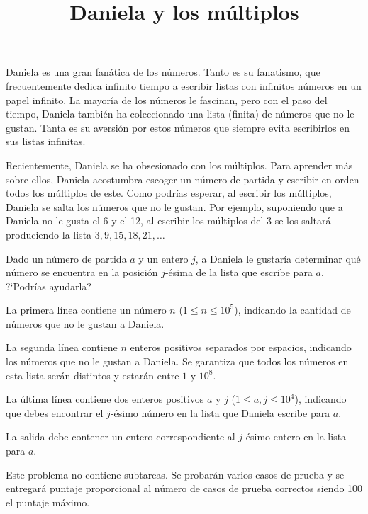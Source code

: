 \documentclass{oci}
\title{Daniela y los múltiplos}
\begin{document}
\begin{problemDescription}
Daniela es una gran fanática de los números.
Tanto es su fanatismo, que frecuentemente dedica infinito tiempo a
escribir listas con infinitos números en un papel infinito.
La mayoría de los números le fascinan, pero con el paso del tiempo,
Daniela también ha coleccionado una lista (finita) de números que no
le gustan.
Tanta es su aversión por estos números que siempre evita escribirlos en sus
listas infinitas.

Recientemente, Daniela se ha obsesionado con los múltiplos.
Para aprender más sobre ellos, Daniela acostumbra escoger un número de partida y
escribir en orden todos los múltiplos de este.
Como podrías esperar, al escribir los múltiplos, Daniela se salta los números que no le gustan.
Por ejemplo, suponiendo que a Daniela no le gusta el 6 y el 12, al escribir los múltiplos
del 3 se los saltará produciendo la lista $3, 9, 15, 18, 21, \ldots$

Dado un número de partida $a$ y un entero $j$, a Daniela le gustaría determinar
qué número se encuentra en la posición $j$-ésima de la lista que escribe para $a$.
?`Podrías ayudarla?
\end{problemDescription}

\begin{inputDescription}
La primera línea contiene un número $n$ ($1 \leq n \leq 10^5$), indicando la cantidad de números que no le gustan
a Daniela.

La segunda línea contiene $n$ enteros positivos separados por espacios,
indicando los números que no le gustan a Daniela.
Se garantiza que todos los números en esta lista serán distintos y estarán entre $1$ y $10^8$.

La última línea contiene dos enteros positivos $a$ y $j$ ($1 \leq a, j \leq 10^4$),
indicando que debes encontrar el $j$-ésimo número en la lista que Daniela
escribe para $a$.
\end{inputDescription}

\begin{outputDescription}
La salida debe contener un entero correspondiente al $j$-ésimo entero en la lista
para $a$.
\end{outputDescription}

\begin{scoreDescription}
Este problema no contiene subtareas.
Se probarán varios casos de prueba y se entregará puntaje proporcional al número
de casos de prueba correctos siendo 100 el puntaje máximo.
\end{scoreDescription}


\begin{sampleDescription}
\end{sampleDescription}
\end{document}
